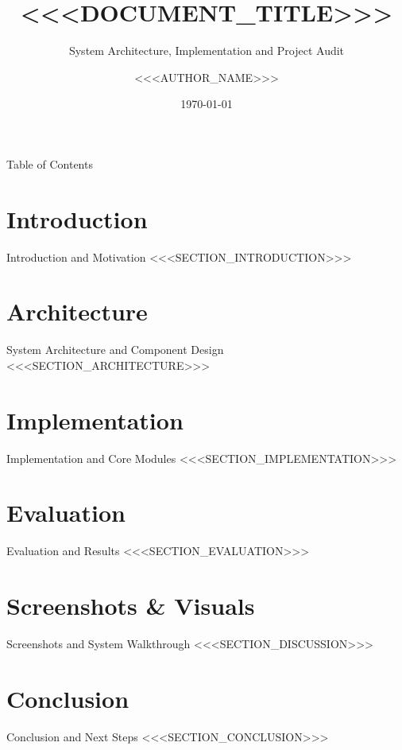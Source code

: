 \documentclass[aspectratio=169]{beamer}
\title{<<<DOCUMENT_TITLE>>>}
\subtitle{System Architecture, Implementation and Project Audit}
\author{<<<AUTHOR_NAME>>>}
\institute{<<<INSTITUTION_NAME>>>}
\date{\today}
\begin{document}
\begin{frame}
  \titlepage
\end{frame}

\begin{frame}{Table of Contents}
  \tableofcontents
\end{frame}

\section{Introduction}
\begin{frame}{Introduction and Motivation}
<<<SECTION_INTRODUCTION>>>
\end{frame}

\section{Architecture}
\begin{frame}{System Architecture and Component Design}
<<<SECTION_ARCHITECTURE>>>
\end{frame}

\section{Implementation}
\begin{frame}{Implementation and Core Modules}
<<<SECTION_IMPLEMENTATION>>>
\end{frame}

\section{Evaluation}
\begin{frame}{Evaluation and Results}
<<<SECTION_EVALUATION>>>
\end{frame}

\section{Screenshots \& Visuals}
\begin{frame}{Screenshots and System Walkthrough}
<<<SECTION_DISCUSSION>>>
\end{frame}

\section{Conclusion}
\begin{frame}{Conclusion and Next Steps}
<<<SECTION_CONCLUSION>>>
\end{frame}
\end{document}
